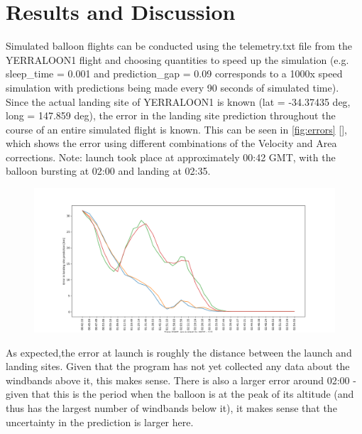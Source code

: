 \documentclass[11pt]{article}
\begin{document}

\section{Results and Discussion}

Simulated balloon flights can be conducted using the telemetry.txt file from the YERRALOON1 flight and choosing quantities to speed up the simulation (e.g. sleep\_time = 0.001 and prediction\_gap = 0.09 corresponds to a 1000x speed simulation with predictions being made every 90 seconds of simulated time). Since the actual landing site of YERRALOON1 is known (lat = -34.37435 deg, long = 147.859 deg), the error in the landing site prediction throughout the course of an entire simulated flight is known. This can be seen in \ref{fig:errors} [], which shows the error using different combinations of the Velocity and Area corrections. Note: launch took place at approximately 00:42 GMT, with the balloon bursting at 02:00 and landing at 02:35.  

\begin{figure} 
  \includegraphics[width=\linewidth]{errors.png}
\end{figure}

As expected,the error at launch is roughly the distance between the launch and landing sites. Given that the program has not yet collected any data about the windbands above it, this makes sense. There is also a larger error around 02:00 - given that this is the period when the balloon is at the peak of its altitude (and thus has the largest number of windbands below it), it makes sense that the uncertainty in the prediction is larger here. \\
\end{document}
